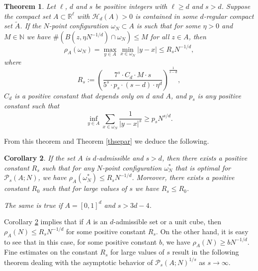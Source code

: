 \documentclass[12pt]{amsart}
\newtheorem{theorem}{Theorem}[section]
\newtheorem{corollary}[theorem]{Corollary}
\theoremstyle{definition}
\def\sli{\sum\limits}
\def\R{\mathbb{R}}
\newcommand{\1}{\mathbf{1}}
\newcommand{\PP}{\mathcal{P}}
\def\H{\mathcal{H}}
\begin{document}
\begin{theorem}\label{thcovering}
Let $\ell$, $d$ and $s$ be positive integers with $\ell\geqslant d$ and $s>d$. Suppose the compact set $A\subset \R^\ell$ with $\H_d(A)>0$ is contained in some $d$-regular compact set $\tilde{A}$. If the $N$-point configuration $\omega_N\subset A$ is such that for some $\eta>0$ and $M\in\mathbb{N}$ we have $\#(B(z, \eta N^{-1/d})\cap \omega_N)\leqslant M$ for all $z\in A$, then 
\begin{equation}
\rho_A(\omega_N)=\max_{y\in A}\min_{x\in \omega_N} |y-x|\leqslant R_s N^{-1/d},
\end{equation}
where
\begin{equation}
R_s:=\left(\frac{7^s \cdot C_d\cdot M\cdot s}{5^s \cdot p_s\cdot (s- d) \cdot\eta^d}\right)^{\frac{1}{s-d}},
\end{equation}
$C_d$ is a positive constant that depends only on $d$ and $A$, and $p_s$ is any positive constant such that 
\begin{equation}\label{pspsps}
\inf_{y\in A} \sli_{x\in \omega_N} \frac{1}{|y-x|^s} \geqslant p_s N^{s/d}.
\end{equation}
\end{theorem}
From this theorem and Theorem \ref{thsepar} we deduce the following.
\begin{corollary}\label{coveringclopen}
If the set $A$ is $d$-admissible and $s>d$, then there exists a positive constant $R_s$ such that for any $N$-point configuration $\omega^*_N$ that is optimal for $\PP_s(A; N)$, we have $\rho_A(\omega^*_N)\leqslant R_s N^{-1/d}$. Moreover, there exists a positive constant $R_0$ such that for large values of $s$ we have $R_s\leqslant R_0$.

The same is true if $A=[0,1]^d$ and $s> 3d-4$.
\end{corollary}



Corollary \ref{coveringclopen} implies that if $A$ is an $d$-admissible set or a unit cube, then $\rho_A(N)\leqslant R_s N^{-1/d}$ for some positive constant $R_s$. On the other hand, it is easy to see that in this case, for some positive constant $b$, we have $\rho_A(N)\geqslant bN^{-1/d}$. Fine estimates on the constant $R_s$ for large values of $s$ result in the following theorem dealing with the asymptotic behavior of $\PP_s(A; N)^{1/s}$ as $s\to \infty$.
\end{document}

